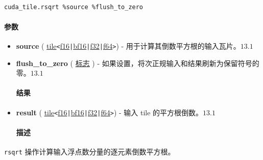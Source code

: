 \documentclass{article}
\begin{document}
\begin{lstlisting}

cuda_tile.rsqrt %source %flush_to_zero

\end{lstlisting}



\paragraph{参数}


\begin{itemize}
\item \textbf{source} ( \href{https://docs.nvidia.com/cuda/tile-ir/latest/sections/types.html#type-tile}{tile}\texttt{<}\href{https://docs.nvidia.com/cuda/tile-ir/latest/sections/types.html#subsection-element-types}{f16}\texttt{|}\href{https://docs.nvidia.com/cuda/tile-ir/latest/sections/types.html#subsection-element-types}{bf16}\texttt{|}\href{https://docs.nvidia.com/cuda/tile-ir/latest/sections/types.html#subsection-element-types}{f32}\texttt{|}\href{https://docs.nvidia.com/cuda/tile-ir/latest/sections/types.html#subsection-element-types}{f64}\texttt{>}) - 用于计算其倒数平方根的输入瓦片。$\boxed{13.1}$
\item \textbf{flush\_to\_zero} ( \href{https://docs.nvidia.com/cuda/tile-ir/latest/sections/operations.html#type-flag}{标志} ) - 如果设置，将次正规输入和结果刷新为保留符号的零。$\boxed{13.1}$




\paragraph{结果}


\item \textbf{result} ( \href{https://docs.nvidia.com/cuda/tile-ir/latest/sections/types.html#type-tile}{tile}\texttt{<}\href{https://docs.nvidia.com/cuda/tile-ir/latest/sections/types.html#subsection-element-types}{f16}\texttt{|}\href{https://docs.nvidia.com/cuda/tile-ir/latest/sections/types.html#subsection-element-types}{bf16}\texttt{|}\href{https://docs.nvidia.com/cuda/tile-ir/latest/sections/types.html#subsection-element-types}{f32}\texttt{|}\href{https://docs.nvidia.com/cuda/tile-ir/latest/sections/types.html#subsection-element-types}{f64}\texttt{>}) - 输入 tile 的平方根倒数。$\boxed{13.1}$




\paragraph{描述}


\end{itemize}
\texttt{rsqrt} 操作计算输入浮点数分量的逐元素倒数平方根。
\end{document}
